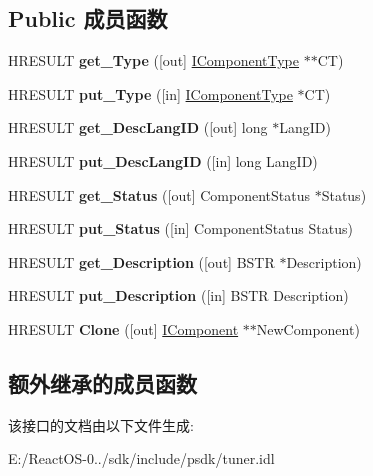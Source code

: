 \subsection*{Public 成员函数}
\begin{DoxyCompactItemize}
\item 
\mbox{\label{interface_i_component_a25901c223c7044c8347fd65cf27980b9}} 
H\+R\+E\+S\+U\+LT {\bfseries get\+\_\+\+Type} (\mbox{[}out\mbox{]} \hyperlink{interface_i_component_type}{I\+Component\+Type} $\ast$$\ast$CT)
\item 
\mbox{\label{interface_i_component_aeddc339d1ae2cdecef716a15beff9a63}} 
H\+R\+E\+S\+U\+LT {\bfseries put\+\_\+\+Type} (\mbox{[}in\mbox{]} \hyperlink{interface_i_component_type}{I\+Component\+Type} $\ast$CT)
\item 
\mbox{\label{interface_i_component_a73f7ad2be74ffcd32125823df406da7d}} 
H\+R\+E\+S\+U\+LT {\bfseries get\+\_\+\+Desc\+Lang\+ID} (\mbox{[}out\mbox{]} long $\ast$Lang\+ID)
\item 
\mbox{\label{interface_i_component_a1b673ef5edbab1f95b6f6fd2d820bbf8}} 
H\+R\+E\+S\+U\+LT {\bfseries put\+\_\+\+Desc\+Lang\+ID} (\mbox{[}in\mbox{]} long Lang\+ID)
\item 
\mbox{\label{interface_i_component_a351a819bccc31b8ce0f9f1274c403f50}} 
H\+R\+E\+S\+U\+LT {\bfseries get\+\_\+\+Status} (\mbox{[}out\mbox{]} Component\+Status $\ast$Status)
\item 
\mbox{\label{interface_i_component_a11d2ff0062c281bc815bd9a9a42c851d}} 
H\+R\+E\+S\+U\+LT {\bfseries put\+\_\+\+Status} (\mbox{[}in\mbox{]} Component\+Status Status)
\item 
\mbox{\label{interface_i_component_a1cb0cf3ead0f136feedf15cd9cbb5154}} 
H\+R\+E\+S\+U\+LT {\bfseries get\+\_\+\+Description} (\mbox{[}out\mbox{]} B\+S\+TR $\ast$Description)
\item 
\mbox{\label{interface_i_component_ac3f4df2cea870ad226097b673eee3f69}} 
H\+R\+E\+S\+U\+LT {\bfseries put\+\_\+\+Description} (\mbox{[}in\mbox{]} B\+S\+TR Description)
\item 
\mbox{\label{interface_i_component_a3f018450c62766cac489885b71163e50}} 
H\+R\+E\+S\+U\+LT {\bfseries Clone} (\mbox{[}out\mbox{]} \hyperlink{interface_i_component}{I\+Component} $\ast$$\ast$New\+Component)
\end{DoxyCompactItemize}
\subsection*{额外继承的成员函数}


该接口的文档由以下文件生成\+:\begin{DoxyCompactItemize}
\item 
E\+:/\+React\+O\+S-\/0../sdk/include/psdk/tuner.\+idl\end{DoxyCompactItemize}
